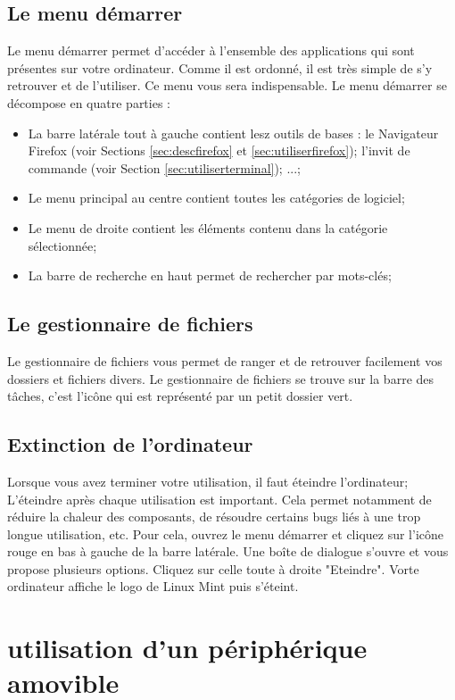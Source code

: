 \documentclass[12pt]{book}
\begin{document}
	\subsection{Le menu démarrer}\label{sec:menudemarrer}
		Le menu démarrer permet d'accéder à l'ensemble des applications qui sont présentes sur votre ordinateur.
		Comme il est ordonné, il est très simple de s'y retrouver et de l'utiliser.
		Ce menu vous sera indispensable.\newline
		Le menu démarrer se décompose en quatre parties :
		\begin{itemize}
			\item La barre latérale tout à gauche contient lesz outils de bases : le Navigateur Firefox (voir Sections \ref{sec:descfirefox} et \ref{sec:utiliserfirefox}); l'invit de commande (voir Section \ref{sec:utiliserterminal}); ...;
			\item Le menu principal au centre contient toutes les catégories de logiciel;
			\item Le menu de droite contient les éléments contenu dans la catégorie sélectionnée;
			\item La barre de recherche en haut permet de rechercher par mots-clés;
		\end{itemize}
	\subsection{Le gestionnaire de fichiers}
		Le gestionnaire de fichiers vous permet de ranger et de retrouver facilement vos dossiers et fichiers divers.\newline
		Le gestionnaire de fichiers se trouve sur la barre des tâches, c'est l'icône qui est représenté par un petit dossier vert.
	\subsection{Extinction de l'ordinateur}
		Lorsque vous avez terminer votre utilisation, il faut éteindre l'ordinateur; L'éteindre après chaque utilisation est important. Cela permet notamment de réduire la chaleur des composants, de résoudre certains bugs liés à une trop longue utilisation, etc.\newline
		Pour cela, ouvrez le menu démarrer et cliquez sur l'icône rouge en bas à gauche de la barre latérale.
		Une boîte de dialogue s'ouvre et vous propose plusieurs options.
		Cliquez sur celle toute à droite "Eteindre".
		Vorte ordinateur affiche le logo de Linux Mint puis s'éteint.
\section{utilisation d'un périphérique amovible}
\end{document}
